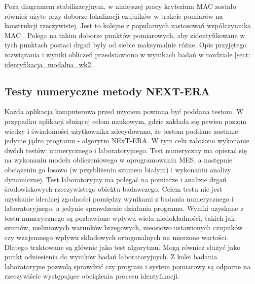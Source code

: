 Poza diagramem stabilizacyjnym, w niniejszej pracy kryterium MAC zostało również użyte przy doborze lokalizacji czujników w trakcie pomiarów na konstrukcji rzeczywistej. Jest to kolejne z popularnych zastosowań współczynnika MAC \parencite{Allemang2003}. Polega na takim doborze punktów pomiarowych, aby zidentyfikowane w tych punktach postaci drgań były od siebie maksymalnie różne. Opis przyjętego rozwiązania i wyniki obliczeń przedstawiono w wynikach badań w rozdziale \ref{sect: identyfikacja_modalna_wk2}.




\subsection{Testy numeryczne metody NEXT-ERA}
Każda aplikacja komputerowa przed użyciem powinna być poddana testom. W przypadku aplikacji służącej celom naukowym, gdzie zakłada się pewien poziom wiedzy i świadomości użytkownika zdecydowano, że testom poddane zostanie jedynie jądro programu - algorytm NExT-ERA. W tym celu założono wykonanie dwóch testów: numerycznego i laboratoryjnego. Test numeryczny ma opierać się na wykonaniu modelu obliczeniowego w oprogramowaniu MES, a następnie obciążeniu go losowo (w przybliżeniu szumem białym) i wykonaniu analizy dynamicznej. Test laboratoryjny ma polegać na pomiarze i analizie drgań środowiskowych rzeczywistego obiektu badawczego. Celem testu nie jest uzyskanie idealnej zgodności pomiędzy wynikami z badania numerycznego i laboratoryjnego, a jedynie sprawdzenie działania programu. Wyniki uzyskane z testu numerycznego są pozbawione wpływu wielu niedokładności, takich jak szumów, nieliniowych warunków brzegowych, nieosiowo ustawionych czujników czy wzajemnego wpływu składowych ortogonalnych na mierzone wartości. Dlatego traktowane są głównie jako test algorytmu. Mogą również służyć jako punkt odniesienia do wyników badań laboratoryjnych. Z kolei badania laboratoryjne pozwolą sprawdzić czy program i system pomiarowy są odporne na rzeczywiście występujące obciążenia procesu identyfikacji.

